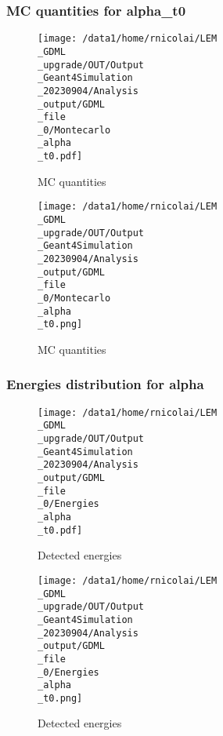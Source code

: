 \documentclass[8pt]{beamer}
\begin{document}
            \begin{frame}
                \frametitle{MC quantities for alpha\_t0}
            
        \begin{figure}[h]
            \centering
            \texttt{[image: /data1/home/rnicolai/LEM\\\_GDML\\\_upgrade/OUT/Output\\\_Geant4Simulation\\\_20230904/Analysis\\\_output/GDML\\\_file\\\_0/Montecarlo\\\_alpha\\\_t0.pdf]}
            \caption{MC quantities}
        \end{figure}
        
        \begin{figure}[h]
            \centering
            \texttt{[image: /data1/home/rnicolai/LEM\\\_GDML\\\_upgrade/OUT/Output\\\_Geant4Simulation\\\_20230904/Analysis\\\_output/GDML\\\_file\\\_0/Montecarlo\\\_alpha\\\_t0.png]}
            \caption{MC quantities}
        \end{figure}
        
            \end{frame}
            
            \begin{frame}
                \frametitle{Energies distribution for alpha}
            
        \begin{figure}[h]
            \centering
            \texttt{[image: /data1/home/rnicolai/LEM\\\_GDML\\\_upgrade/OUT/Output\\\_Geant4Simulation\\\_20230904/Analysis\\\_output/GDML\\\_file\\\_0/Energies\\\_alpha\\\_t0.pdf]}
            \caption{Detected energies}
        \end{figure}
        
        \begin{figure}[h]
            \centering
            \texttt{[image: /data1/home/rnicolai/LEM\\\_GDML\\\_upgrade/OUT/Output\\\_Geant4Simulation\\\_20230904/Analysis\\\_output/GDML\\\_file\\\_0/Energies\\\_alpha\\\_t0.png]}
            \caption{Detected energies}
        \end{figure}
        
            \end{frame}
            
\end{document}

